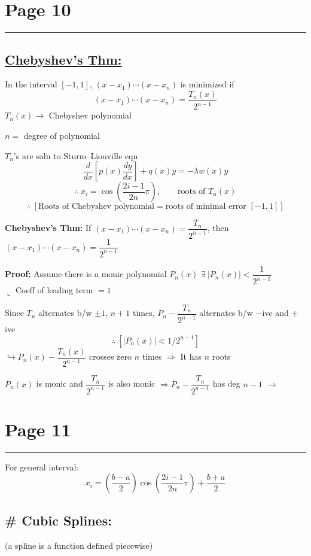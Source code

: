 \documentclass[11pt,a4paper]{article}
\newcommand{\pagehead}[1]{%
  \clearpage
  \section*{Page #1}
  \vspace{-0.6em}
  {\color{black!45}\rule{\linewidth}{0.5pt}}
  \vspace{0.4em}
}
\begin{document}
\pagehead{10}

\subsection*{\underline{Chebyshev's Thm:}}

In the interval $[-1,1]$, $(x-x_1)\cdots(x-x_n)$ is minimized if
\[
(x-x_1)\cdots(x-x_n)=\frac{T_n(x)}{2^{n-1}}
\]
$T_n(x)\to$ Chebyshev polynomial

$n=$ degree of polynomial

$T_n$'s are soln to Sturm--Liouville eqn
\[
\frac{d}{dx}\left[p(x)\frac{dy}{dx}\right]+q(x)y=-\lambda w(x)y
\]
\[
\therefore\ x_i=\cos\left(\frac{2i-1}{2n}\pi\right),\qquad
\text{roots of }T_n(x)
\]
\[
\therefore\ [\text{Roots of Chebyshev polynomial}
=\text{roots of minimal error }[-1,1]]
\]

\textbf{Chebyshev's Thm:} If
$(x-x_1)\cdots(x-x_n)=\dfrac{T_n}{2^{n-1}}$, then
$(x-x_1)\cdots(x-x_n)=\dfrac{1}{2^{n-1}}$

\textbf{Proof:} Assume there is a monic polynomial $P_n(x)$
$\exists\ |P_n(x)|<\dfrac{1}{2^{n-1}}$\\
\hspace*{1.2cm}$\llcorner$ Coeff of leading term $=1$

Since $T_n$ alternates b/w $\pm1$, $n+1$ times,
$P_n-\dfrac{T_n}{2^{n-1}}$ alternates b/w $-$ive and $+$ive
\[
\therefore\ \left[|P_n(x)|<1/2^{n-1}\right]
\]
$\hookrightarrow P_n(x)-\dfrac{T_n(x)}{2^{n-1}}$ \quad crosses zero $n$ times
$\Rightarrow$ It has $n$ roots

$P_n(x)$ is monic and $\dfrac{T_n}{2^{n-1}}$ is also monic
$\Rightarrow P_n-\dfrac{T_n}{2^{n-1}}$ has deg $n-1$ $\longrightarrow$

\pagehead{11}

For general interval:
\[
x_i=\left(\frac{b-a}{2}\right)\cos\left(\frac{2i-1}{2n}\pi\right)
+\frac{b+a}{2}
\]

\subsection*{\# Cubic Splines:}
(a spline is a function defined piecewise)

\begin{center}
\end{center}
\end{document}

